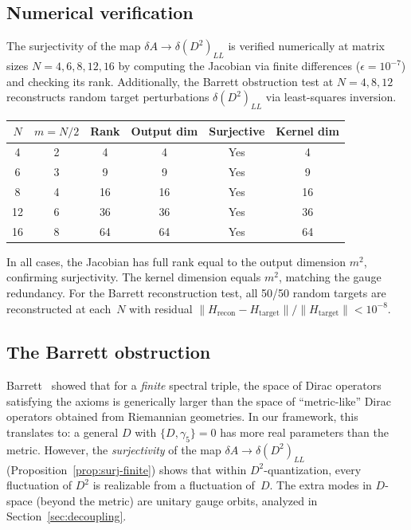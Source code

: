 \documentclass[12pt,a4paper]{article}
\theoremstyle{definition}
\theoremstyle{remark}
\begin{document}
\subsection{Numerical verification}

The surjectivity of the map $\delta A \to \delta(D^2)_{LL}$ is verified
numerically at matrix sizes $N = 4, 6, 8, 12, 16$ by computing the
Jacobian via finite differences ($\epsilon = 10^{-7}$) and checking its
rank.  Additionally, the Barrett obstruction test at $N = 4, 8, 12$
reconstructs random target perturbations $\delta(D^2)_{LL}$ via
least-squares inversion.

\begin{center}
\begin{tabular}{cccccc}
\toprule
$N$ & $m = N/2$ & Rank & Output dim & Surjective & Kernel dim \\
\midrule
4  & 2 & 4  & 4  & Yes & 4  \\
6  & 3 & 9  & 9  & Yes & 9  \\
8  & 4 & 16 & 16 & Yes & 16 \\
12 & 6 & 36 & 36 & Yes & 36 \\
16 & 8 & 64 & 64 & Yes & 64 \\
\bottomrule
\end{tabular}
\end{center}

In all cases, the Jacobian has full rank equal to the output dimension
$m^2$, confirming surjectivity.  The kernel dimension equals $m^2$,
matching the gauge redundancy.  For the Barrett reconstruction test,
all 50/50 random targets are reconstructed at each~$N$ with residual
$\|H_{\mathrm{recon}} - H_{\mathrm{target}}\|/\|H_{\mathrm{target}}\| < 10^{-8}$.

\subsection{The Barrett obstruction}

Barrett~\cite{Barrett2015} showed that for a \emph{finite} spectral triple,
the space of Dirac operators satisfying the axioms is generically larger
than the space of ``metric-like'' Dirac operators obtained from Riemannian
geometries.  In our framework, this translates to: a general $D$ with
$\{D,\gamma_5\} = 0$ has more real parameters than the metric.  However,
the \emph{surjectivity} of the map $\delta A \to \delta(D^2)_{LL}$
(Proposition~\ref{prop:surj-finite}) shows that within $D^2$-quantization,
every fluctuation of $D^2$ is realizable from a fluctuation of~$D$.
The extra modes in $D$-space (beyond the metric) are unitary gauge orbits,
analyzed in Section~\ref{sec:decoupling}.
\end{document}
